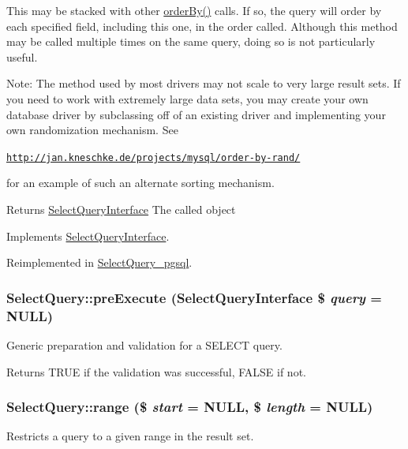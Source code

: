 This may be stacked with other \hyperlink{classSelectQuery_a32ede93f2abfd7f8bc388d0c00512fae}{orderBy()} calls. If so, the query will order by each specified field, including this one, in the order called. Although this method may be called multiple times on the same query, doing so is not particularly useful.

Note: The method used by most drivers may not scale to very large result sets. If you need to work with extremely large data sets, you may create your own database driver by subclassing off of an existing driver and implementing your own randomization mechanism. See

\href{http://jan.kneschke.de/projects/mysql/order-by-rand/}{\tt http://jan.kneschke.de/projects/mysql/order-\/by-\/rand/}

for an example of such an alternate sorting mechanism.

\begin{DoxyReturn}{Returns}
\hyperlink{interfaceSelectQueryInterface}{SelectQueryInterface} The called object 
\end{DoxyReturn}


Implements \hyperlink{interfaceSelectQueryInterface_a647a3152b4cee89205bb9d7274ffd019}{SelectQueryInterface}.

Reimplemented in \hyperlink{classSelectQuery__pgsql_a2aac16a64fec955bf8313aabdcad0fec}{SelectQuery\_\-pgsql}.\hypertarget{classSelectQuery_a2b848ae6bd4c4e2059247a03b7ab6375}{
\subsubsection[{preExecute}]{\setlength{\rightskip}{0pt plus 5cm}SelectQuery::preExecute ({\bf SelectQueryInterface} \$ {\em query} = {\ttfamily NULL})}}
\label{classSelectQuery_a2b848ae6bd4c4e2059247a03b7ab6375}
Generic preparation and validation for a SELECT query.

\begin{DoxyReturn}{Returns}
TRUE if the validation was successful, FALSE if not. 
\end{DoxyReturn}
\hypertarget{classSelectQuery_a11a242cc59d1e2dee26848d5ab8de236}{
\subsubsection[{range}]{\setlength{\rightskip}{0pt plus 5cm}SelectQuery::range (\$ {\em start} = {\ttfamily NULL}, \/  \$ {\em length} = {\ttfamily NULL})}}
\label{classSelectQuery_a11a242cc59d1e2dee26848d5ab8de236}
Restricts a query to a given range in the result set.


